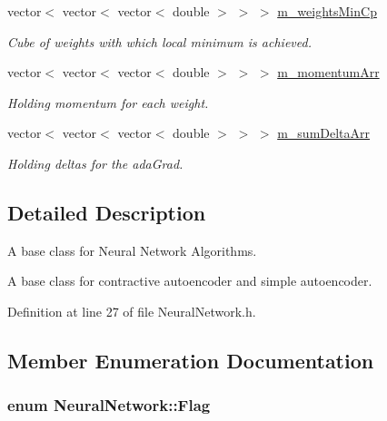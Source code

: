 \begin{DoxyCompactItemize}
vector$<$ vector$<$ vector$<$ double $>$ $>$ $>$ \hyperlink{classNeuralNetwork_a9ac6bc441d6e2bfe7521d0b23ac8efdb}{m\+\_\+weights\+Min\+Cp}
\begin{DoxyCompactList}\small\item\em Cube of weights with which local minimum is achieved. \end{DoxyCompactList}\item 
vector$<$ vector$<$ vector$<$ double $>$ $>$ $>$ \hyperlink{classNeuralNetwork_a4345c084a3e1f604a3757e3b1ae3ad54}{m\+\_\+momentum\+Arr}
\begin{DoxyCompactList}\small\item\em Holding momentum for each weight. \end{DoxyCompactList}\item 
vector$<$ vector$<$ vector$<$ double $>$ $>$ $>$ \hyperlink{classNeuralNetwork_a0b6c7ff6e00c4f91e684217be91b0a28}{m\+\_\+sum\+Delta\+Arr}
\begin{DoxyCompactList}\small\item\em Holding deltas for the ada\+Grad. \end{DoxyCompactList}\end{DoxyCompactItemize}


\subsection{Detailed Description}
A base class for Neural Network Algorithms. 

A base class for contractive autoencoder and simple autoencoder. 

Definition at line 27 of file Neural\+Network.\+h.



\subsection{Member Enumeration Documentation}
\subsubsection[{\texorpdfstring{Flag}{Flag}}]{\setlength{\rightskip}{0pt plus 5cm}enum {\bf Neural\+Network\+::\+Flag}\hspace{0.3cm}{\ttfamily [protected]}}\hypertarget{classNeuralNetwork_a4c1c6e488b842002a6d327726ff92dc5}{}\label{classNeuralNetwork_a4c1c6e488b842002a6d327726ff92dc5}


